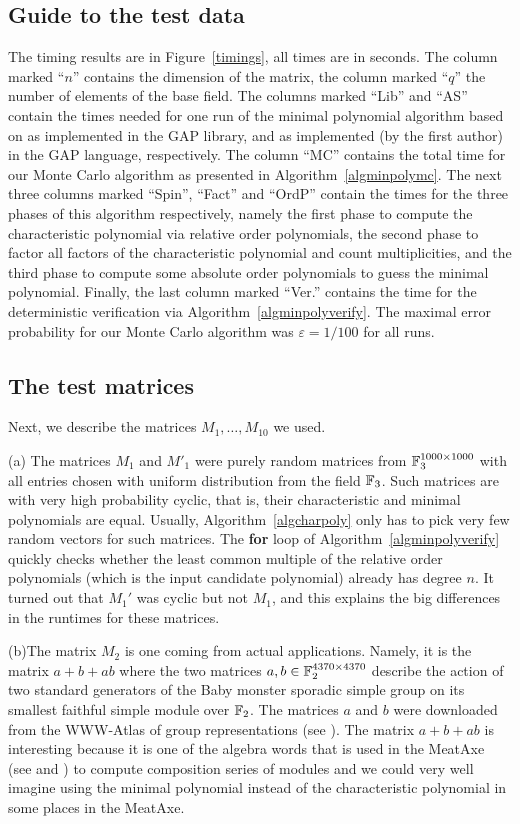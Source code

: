 \subsection{Guide to the test data}
The timing results
are in Figure~\ref{timings}, all times are in seconds. 
The column marked ``$n$'' contains the
dimension of the matrix, the column marked ``$q$'' the number of elements
of the base field. 
The columns marked ``Lib'' and ``AS'' contain the times needed for one run of 
the minimal polynomial algorithm based on \cite{Steel} as implemented in 
the {\sf GAP} library, and as implemented (by the first author) in the
{\sf GAP} language, respectively.
The column ``MC'' contains the total time for our 
Monte Carlo algorithm as presented in Algorithm~\ref{algminpolymc}.
The next three columns marked ``Spin'', ``Fact'' and ``OrdP''
contain the times for the three phases of this algorithm respectively, 
namely the first phase to compute the characteristic polynomial via
relative order polynomials, the second phase to factor all factors of
the characteristic polynomial and count multiplicities, and the third
phase to compute some absolute order polynomials to guess the minimal
polynomial. Finally, the last column marked ``Ver.'' contains
the time for the deterministic verification via 
%
Algorithm~\ref{algminpolyverify}.
The maximal error probability for our Monte Carlo algorithm was
$\varepsilon = 1/100$ for all runs.


\subsection{The test matrices}
Next, we describe the matrices $M_1, \ldots, M_{10}$ we used.

(a) \quad The matrices $M_1$ and $M'_1$ were purely random matrices from
$\mathbb{F}_3^{1000\times 1000}$ with all entries
chosen with uniform distribution from the field $\mathbb{F}_3$. Such matrices
are with very high probability cyclic, that is, their characteristic and
minimal polynomials are equal. Usually, Algorithm~\ref{algcharpoly} only
has to pick very few random vectors for such matrices. The {\bf for} loop
of Algorithm~\ref{algminpolyverify} quickly checks whether the least common multiple
of the relative order polynomials (which is the input candidate polynomial)
already has degree $n$. It turned out that $M_1'$ was cyclic but not $M_1$, 
and this explains the
big differences in the runtimes for these matrices.

(b)\quad The matrix $M_2$ is one coming from actual applications. Namely, it is
the matrix $a+b+ab$ where the two matrices $a,b \in \mathbb{F}_2^{4370 \times
4370}$ describe the action of two standard generators of the Baby monster
sporadic simple group on its smallest faithful simple module over $\mathbb{F}_2$.
The matrices $a$ and $b$ were downloaded from the WWW-Atlas of group
%
representations (see \cite{WWWAtlas}). The matrix $a+b+ab$ is
interesting because it is one of the algebra words that is used
in the {\sc MeatAxe} (see \cite{MeatAxeParker} and \cite{MeatAxeHoltRees})
to compute composition series of modules and
we could very well imagine using the minimal polynomial instead of
the characteristic polynomial in some places in the {\sc MeatAxe}.

